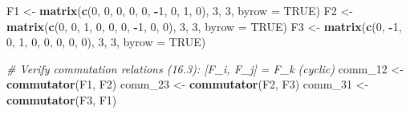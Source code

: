 \documentclass[
]{book}
\newenvironment{Shaded}{\begin{snugshade}}{\end{snugshade}}
\newcommand{\AttributeTok}[1]{\textcolor[rgb]{0.13,0.29,0.53}{#1}}
\newcommand{\CommentTok}[1]{\textcolor[rgb]{0.56,0.35,0.01}{\textit{#1}}}
\newcommand{\ConstantTok}[1]{\textcolor[rgb]{0.56,0.35,0.01}{#1}}
\newcommand{\DecValTok}[1]{\textcolor[rgb]{0.00,0.00,0.81}{#1}}
\newcommand{\FunctionTok}[1]{\textcolor[rgb]{0.13,0.29,0.53}{\textbf{#1}}}
\newcommand{\NormalTok}[1]{#1}
\newcommand{\OtherTok}[1]{\textcolor[rgb]{0.56,0.35,0.01}{#1}}
\newcommand{\SpecialCharTok}[1]{\textcolor[rgb]{0.81,0.36,0.00}{\textbf{#1}}}
\theoremstyle{definition}
\theoremstyle{definition}
\theoremstyle{definition}
\theoremstyle{definition}
\theoremstyle{remark}
\begin{document}
\begin{Shaded}
\begin{Highlighting}[]
\NormalTok{F1 }\OtherTok{\textless{}{-}} \FunctionTok{matrix}\NormalTok{(}\FunctionTok{c}\NormalTok{(}\DecValTok{0}\NormalTok{, }\DecValTok{0}\NormalTok{, }\DecValTok{0}\NormalTok{, }\DecValTok{0}\NormalTok{, }\DecValTok{0}\NormalTok{, }\SpecialCharTok{{-}}\DecValTok{1}\NormalTok{, }\DecValTok{0}\NormalTok{, }\DecValTok{1}\NormalTok{, }\DecValTok{0}\NormalTok{), }\DecValTok{3}\NormalTok{, }\DecValTok{3}\NormalTok{, }\AttributeTok{byrow =} \ConstantTok{TRUE}\NormalTok{)}
\NormalTok{F2 }\OtherTok{\textless{}{-}} \FunctionTok{matrix}\NormalTok{(}\FunctionTok{c}\NormalTok{(}\DecValTok{0}\NormalTok{, }\DecValTok{0}\NormalTok{, }\DecValTok{1}\NormalTok{, }\DecValTok{0}\NormalTok{, }\DecValTok{0}\NormalTok{, }\DecValTok{0}\NormalTok{, }\SpecialCharTok{{-}}\DecValTok{1}\NormalTok{, }\DecValTok{0}\NormalTok{, }\DecValTok{0}\NormalTok{), }\DecValTok{3}\NormalTok{, }\DecValTok{3}\NormalTok{, }\AttributeTok{byrow =} \ConstantTok{TRUE}\NormalTok{)}
\NormalTok{F3 }\OtherTok{\textless{}{-}} \FunctionTok{matrix}\NormalTok{(}\FunctionTok{c}\NormalTok{(}\DecValTok{0}\NormalTok{, }\SpecialCharTok{{-}}\DecValTok{1}\NormalTok{, }\DecValTok{0}\NormalTok{, }\DecValTok{1}\NormalTok{, }\DecValTok{0}\NormalTok{, }\DecValTok{0}\NormalTok{, }\DecValTok{0}\NormalTok{, }\DecValTok{0}\NormalTok{, }\DecValTok{0}\NormalTok{), }\DecValTok{3}\NormalTok{, }\DecValTok{3}\NormalTok{, }\AttributeTok{byrow =} \ConstantTok{TRUE}\NormalTok{)}

\CommentTok{\# Verify commutation relations (16.3): [F\_i, F\_j] = F\_k (cyclic)}
\NormalTok{comm\_12 }\OtherTok{\textless{}{-}} \FunctionTok{commutator}\NormalTok{(F1, F2)}
\NormalTok{comm\_23 }\OtherTok{\textless{}{-}} \FunctionTok{commutator}\NormalTok{(F2, F3)}
\NormalTok{comm\_31 }\OtherTok{\textless{}{-}} \FunctionTok{commutator}\NormalTok{(F3, F1)}


\end{Highlighting}
\end{Shaded}
\end{document}
